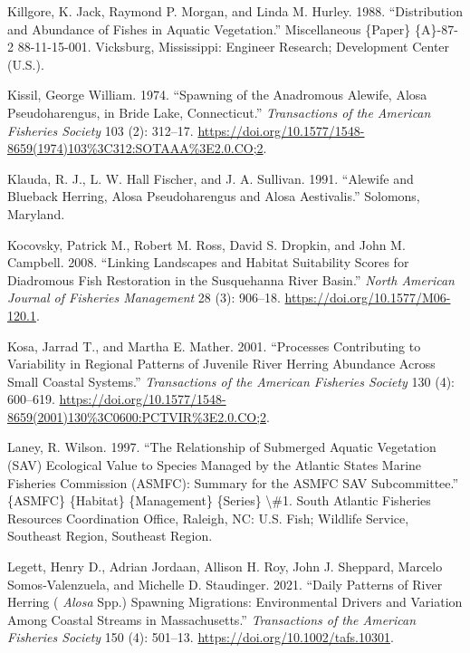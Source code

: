 \documentclass[
]{book}
\newlength{\cslhangindent}
\newlength{\cslentryspacingunit} %
\newenvironment{CSLReferences}[2] %
 {%
  \setlength{\parindent}{0pt}
  \ifodd #1
  \let\oldpar\par
  \def\par{\hangindent=\cslhangindent\oldpar}
  \fi
  \setlength{\parskip}{#2\cslentryspacingunit}
 }%
 {}
\begin{document}
\begin{CSLReferences}{1}{0}
\leavevmode{}%
Killgore, K. Jack, Raymond P. Morgan, and Linda M. Hurley. 1988. {``Distribution and {Abundance} of {Fishes} in {Aquatic} {Vegetation}.''} Miscellaneous \{Paper\} \{A\}-87-2 88-11-15-001. Vicksburg, Mississippi: Engineer Research; Development Center (U.S.).

\leavevmode{}%
Kissil, George William. 1974. {``Spawning of the {Anadromous} {Alewife}, {Alosa} Pseudoharengus, in {Bride} {Lake}, {Connecticut}.''} \emph{Transactions of the American Fisheries Society} 103 (2): 312--17. \url{https://doi.org/10.1577/1548-8659(1974)103\%3C312:SOTAAA\%3E2.0.CO;2}.

\leavevmode{}%
Klauda, R. J., L. W. Hall Fischer, and J. A. Sullivan. 1991. {``Alewife and {Blueback} {Herring}, {Alosa} Pseudoharengus and {Alosa} Aestivalis.''} Solomons, Maryland.

\leavevmode{}%
Kocovsky, Patrick M., Robert M. Ross, David S. Dropkin, and John M. Campbell. 2008. {``Linking {Landscapes} and {Habitat} {Suitability} {Scores} for {Diadromous} {Fish} {Restoration} in the {Susquehanna} {River} {Basin}.''} \emph{North American Journal of Fisheries Management} 28 (3): 906--18. \url{https://doi.org/10.1577/M06-120.1}.

\leavevmode{}%
Kosa, Jarrad T., and Martha E. Mather. 2001. {``Processes {Contributing} to {Variability} in {Regional} {Patterns} of {Juvenile} {River} {Herring} {Abundance} Across {Small} {Coastal} {Systems}.''} \emph{Transactions of the American Fisheries Society} 130 (4): 600--619. \url{https://doi.org/10.1577/1548-8659(2001)130\%3C0600:PCTVIR\%3E2.0.CO;2}.

\leavevmode{}%
Laney, R. Wilson. 1997. {``The {Relationship} of {Submerged} {Aquatic} {Vegetation} ({SAV}) {Ecological} {Value} to {Species} {Managed} by the {Atlantic} {States} {Marine} {Fisheries} {Commission} ({ASMFC}): {Summary} for the {ASMFC} {SAV} {Subcommittee}.''} \{ASMFC\} \{Habitat\} \{Management\} \{Series\} \textbackslash\#1. South Atlantic Fisheries Resources Coordination Office, Raleigh, NC: U.S. Fish; Wildlife Service, Southeast Region, Southeast Region.

\leavevmode{}%
Legett, Henry D., Adrian Jordaan, Allison H. Roy, John J. Sheppard, Marcelo Somos‐Valenzuela, and Michelle D. Staudinger. 2021. {``Daily {Patterns} of {River} {Herring} ( \emph{Alosa} Spp.) {Spawning} {Migrations}: {Environmental} {Drivers} and {Variation} Among {Coastal} {Streams} in {Massachusetts}.''} \emph{Transactions of the American Fisheries Society} 150 (4): 501--13. \url{https://doi.org/10.1002/tafs.10301}.


\end{CSLReferences}
\end{document}
